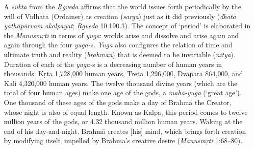 A \textit{sūkta} from the \textit{Ṛgveda} affirms that the world issues forth periodically by the will of Vidhātā (Ordainer) as creation (\textit{sarga}) just as it did previously (\textit{dhātā yathāpūrvam akalpayat}; \textit{Ṛgveda} 10.190.3). The concept of ‘period’ is elaborated in the \textit{Manusmṛti}  in terms of \textit{yuga}: worlds arise and dissolve and arise again and again through the four \hbox{\textit{yuga-s.}} \textit{Yuga} also configures the relation of time and ultimate truth and reality (\textit{brahman}) that is deemed to be invariable (\textit{nitya}). Duration of each of the \textit{yuga-}s is a decreasing number of human years in thousands: Kṛta 1,728,000 human years, Tretā 1,296,000, Dvāpara 864,000, and Kali 4,320,000 human years. The twelve thousand divine years (which are the total of four human ages) make one age of the gods, a \textit{mahā-yuga} (‘great age’). One thousand of these ages of the gods make a day of Brahmā the Creator, whose night is also of equal length. Known as Kalpa, this period comes to twelve million years of the gods, or 4.32 thousand million human years. Waking at the end of his day-and-night, Brahmā creates [his] mind, which brings forth creation by modifying itself, impelled by Brahma’s creative desire (\textit{Manusmṛti}  1:68–80).

